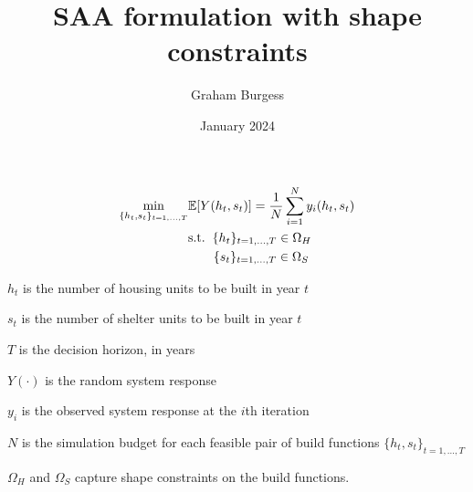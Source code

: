 \documentclass{article}
\title{SAA formulation with shape constraints}
\author{Graham Burgess}
\date{January 2024}
\begin{document}
\maketitle

\begin{align*}
  \min_{\{h_{t}, s_{t}\}_{t = 1, ..., T}} & \mathbb{E} [Y(h_{t},s_{t})] = \frac{1}{N}\sum_{i=1}^{N}y_{i}(h_{t},s_{t}) \\
  & \text{s.t.} \hspace{0.2cm} \{h_{t}\}_{t=1, ..., T} \in \Omega_{H} \\
  & \hspace{0.7cm} \{s_{t}\}_{t=1, ..., T} \in \Omega_{S} \\
\end{align*}

$h_t$ is the number of housing units to be built in year $t$ 

$s_t$ is the number of shelter units to be built in year $t$ 

$T$ is the decision horizon, in years 

$Y(\cdot)$ is the random system response

$y_i$ is the observed system response at the $i$th iteration

$N$ is the simulation budget for each feasible pair of build functions $\{h_t,s_t\}_{t = 1, ..., T}$

$\Omega_H$ and $\Omega_S$ capture shape constraints on the build functions. 
\end{document}
